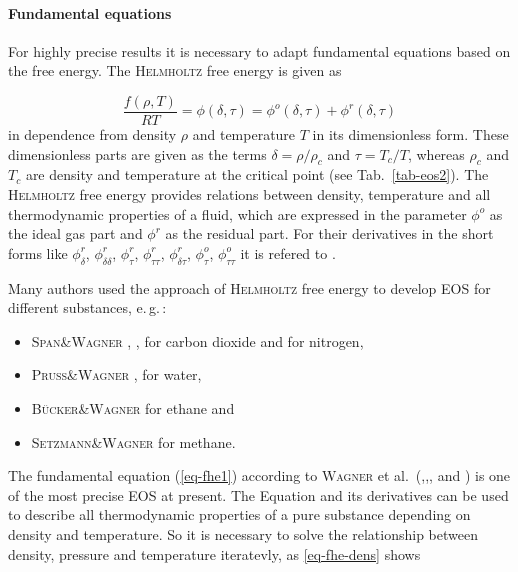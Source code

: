 \paragraph {Fundamental equations}			
For highly precise results it is necessary to adapt fundamental equations based on the free energy. The \textsc{Helmholtz} free energy is given as

\begin{equation}
\frac{f(\rho,T)}{RT}=\phi(\delta,\tau)=\phi^{o}(\delta,\tau)+\phi^{r}(\delta,\tau)
\label{eq-fhe1}
\end{equation}
in dependence from density $\rho$ and temperature $T$ in its dimensionless form. These dimensionless parts are given as the terms $\delta=\rho/\rho_c$ and $\tau=T_c/T$, whereas $\rho_c$ and $T_c$ are density and temperature at the critical point (see Tab.~\ref{tab-eos2}).  The \textsc{Helmholtz} free energy provides relations between density, temperature and all thermodynamic properties of a fluid, which are expressed in the parameter $\phi^{o}$ as the ideal gas part and $\phi^{r}$ as the residual part. For their derivatives in the short forms like
$\phi^r_\delta$,\hspace{0.1cm} 
$\phi^r_{\delta\delta}$,\hspace{0.1cm} 
$\phi^r_\tau$,\hspace{0.1cm} 
$\phi^r_{\tau\tau}$,\hspace{0.1cm} 
$\phi^r_{\delta\tau}$,\hspace{0.1cm}
$\phi^o_\tau$,\hspace{0.1cm} 
$\phi^o_{\tau\tau}$
it is refered to \cite{SpaWag:96}.

Many authors used the approach of \textsc{Helmholtz} free energy to develop EOS for different substances, e.\,g.\,:

\begin{itemize}
\item \textsc{Span\&Wagner} \cite{SpaWag:96}, \cite{Spa:93}, \cite{SpaLem:00} for carbon dioxide and for nitrogen,
\item \textsc{Pruß\&Wagner} \cite{PruWag:95}, \cite{WagPru:02} for water,
\item \textsc{Bücker\&Wagner} \cite{BueWag:06} for ethane and
\item \textsc{Setzmann\&Wagner} \cite{SetWag:91} for methane.
\end{itemize}

The fundamental equation (\ref{eq-fhe1}) according to \textsc{Wagner} et al.\ (\cite{SpaWag:96},\cite{PruWag:95},\cite{BueWag:06}, and \cite{SetWag:91}) is one of the most precise EOS at present. The Equation and its derivatives can be used to describe all thermodynamic properties of a pure substance depending on density and temperature. So it is necessary to solve the relationship between density, pressure and temperature  iteratevly, as \eqref{eq-fhe-dens} shows

